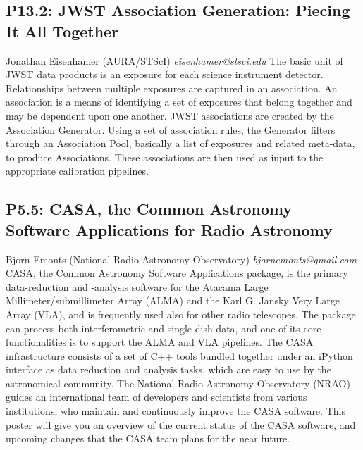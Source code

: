\documentclass{report}
\begin{document}
\subsection*{P13.2: JWST Association Generation: Piecing It All Together}
\bigskip
Jonathan Eisenhamer (AURA/STScI) \newline   \newline   \newline   \newline  \newline  \newline\newline
{\it eisenhamer@stsci.edu}\newline
\newline\newline
The basic unit of JWST data products is an exposure for each science instrument detector. Relationships between multiple exposures are captured in an association.  An association is a means of identifying a set of exposures that belong together and may be dependent upon one another. JWST associations are created by the Association Generator. Using a set of association rules, the Generator filters through an Association Pool, basically a list of exposures and related meta-data, to produce Associations. These associations are then used as input to the appropriate calibration pipelines.\newline
\newpage
\subsection*{P5.5: CASA, the Common Astronomy Software Applications for Radio Astronomy}
\bigskip
Bjorn Emonts (National Radio Astronomy Observatory) \newline   \newline   \newline   \newline  \newline  \newline\newline
{\it bjornemonts@gmail.com}\newline
\newline\newline
CASA, the Common Astronomy Software Applications package, is the primary data-reduction and -analysis software for the Atacama Large Millimeter/submillimeter Array (ALMA) and the Karl G. Jansky Very Large Array (VLA), and is frequently used also for other radio telescopes. The package can process both interferometric and single dish data, and one of its core functionalities is to support the ALMA and VLA pipelines. The CASA infrastructure consists of a set of C++ tools bundled together under an iPython interface as data reduction and analysis tasks, which are easy to use by the astronomical community. The National Radio Astronomy Observatory (NRAO) guides an international team of developers and scientists from various institutions, who maintain and continuously improve the CASA software. This poster will give you an overview of the current status of the CASA software, and upcoming changes that the CASA team plans for the near future.\newline
\newpage
\end{document}
